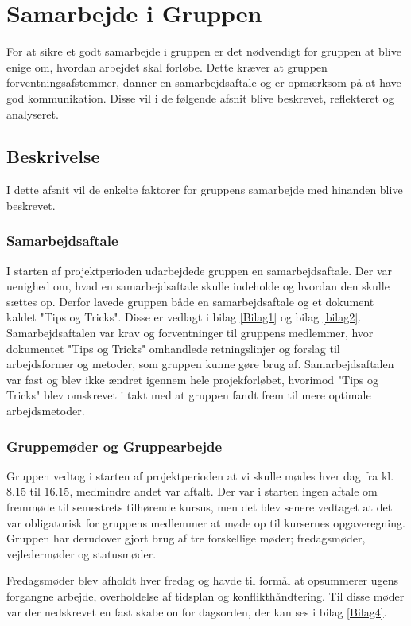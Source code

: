 \chapter{Samarbejde i Gruppen}
For at sikre et godt samarbejde i gruppen er det nødvendigt for gruppen at blive enige om, hvordan arbejdet skal forløbe. Dette kræver at gruppen forventningsafstemmer, danner en samarbejdsaftale og er opmærksom på at have god kommunikation. Disse vil i de følgende afsnit blive beskrevet, reflekteret og analyseret.

\section{Beskrivelse}
I dette afsnit vil de enkelte faktorer for gruppens samarbejde med hinanden blive beskrevet. 

\subsection{Samarbejdsaftale}
I starten af projektperioden udarbejdede gruppen en samarbejdsaftale. Der var uenighed om, hvad en samarbejdsaftale skulle indeholde og hvordan den skulle sættes op. Derfor lavede gruppen både en samarbejdsaftale og et dokument kaldet "Tips og Tricks". Disse er vedlagt i bilag \ref{Bilag1} og bilag \ref{bilag2}. Samarbejdsaftalen var krav og forventninger til gruppens medlemmer, hvor dokumentet "Tips og Tricks" omhandlede retningslinjer og forslag til arbejdsformer og metoder, som gruppen kunne gøre brug af. Samarbejdsaftalen var fast og blev ikke ændret igennem hele projekforløbet, hvorimod "Tips og Tricks" blev omskrevet i takt med at gruppen fandt frem til mere optimale arbejdsmetoder. 

\subsection{Gruppemøder og Gruppearbejde}
Gruppen vedtog i starten af projektperioden at vi skulle mødes hver dag fra kl. $8.15$ til $16.15$, medmindre andet var aftalt. Der var i starten ingen aftale om fremmøde til semestrets tilhørende kursus, men det blev senere vedtaget at det var obligatorisk for gruppens medlemmer at møde op til kursernes opgaveregning.
Gruppen har derudover gjort brug af tre forskellige møder; fredagsmøder, vejledermøder og statusmøder.

Fredagsmøder blev afholdt hver fredag og havde til formål at opsummerer ugens forgangne arbejde, overholdelse af tidsplan og konflikthåndtering. Til disse møder var der nedskrevet en fast skabelon for dagsorden, der kan ses i bilag \ref{Bilag4}.

